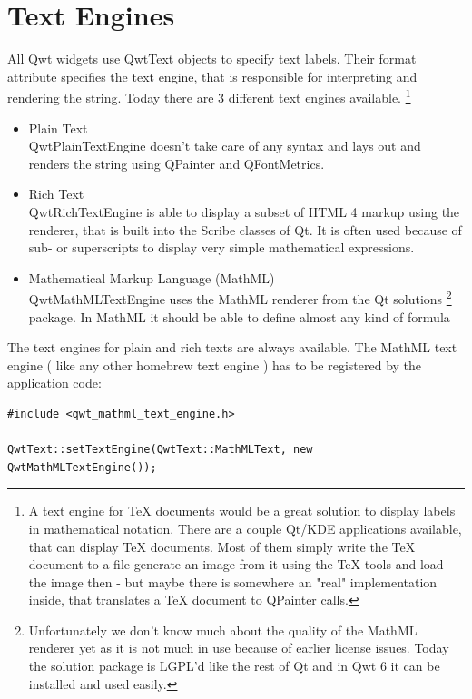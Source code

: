 \documentclass[12pt,a4paper]{book}
\begin{document}
\chapter{Text Engines}

All Qwt widgets use QwtText objects to specify text labels. 
Their format attribute specifies the text engine, that is 
responsible for interpreting and rendering the string. 
Today there are 3 different text engines available.
\footnote{A text engine for TeX documents would be a great 
solution to display labels in mathematical notation. 
There are a couple Qt/KDE applications available, 
that can display TeX documents. Most of them simply write 
the TeX document to a file generate an image from it using the 
TeX tools and load the image then - but maybe there is 
somewhere an "real" implementation inside, that 
translates a TeX document to QPainter calls. }

\begin{itemize}

\item Plain Text\\
QwtPlainTextEngine doesn't take care of any syntax and lays out and renders 
the string using QPainter and QFontMetrics.

\item Rich Text\\
QwtRichTextEngine is able to display a subset of HTML 4 markup using the renderer,
that is built into the Scribe classes of Qt. It is often used because of
sub- or superscripts to display very simple mathematical expressions.

\item Mathematical Markup Language (MathML)\\
QwtMathMLTextEngine uses the MathML renderer from the Qt solutions
\footnote{
Unfortunately we don't know much about the quality of the MathML renderer yet
as it is not much in use because of earlier license issues. 
Today the solution package is LGPL'd like the rest of Qt and in Qwt 6 it can be
installed and used easily.
}
package. In MathML it should be able to define almost any kind of formula

\end{itemize}

The text engines for plain and rich texts are always available. 
The MathML text engine ( like any other homebrew text engine ) has to be
registered by the application code:

\begin{lstlisting}
#include <qwt_mathml_text_engine.h>

QwtText::setTextEngine(QwtText::MathMLText, new QwtMathMLTextEngine());
\end{lstlisting}
\end{document}

